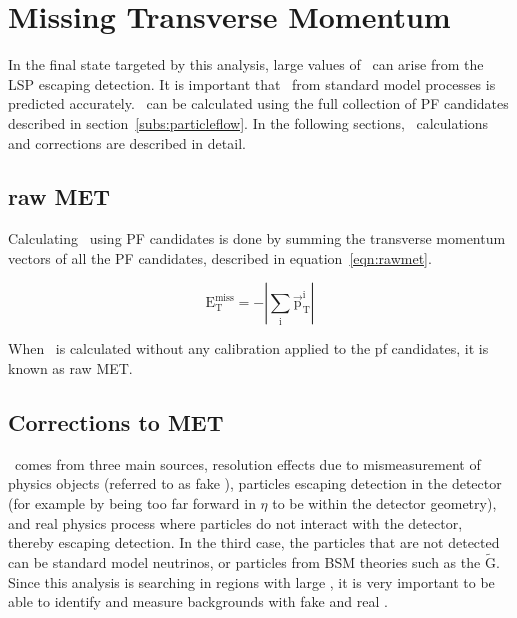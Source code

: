 \chapter{Missing Transverse Momentum}
\label{ch:MET}
In the final state targeted by this analysis, large values of \MET\ can arise from the LSP escaping detection.
It is important that \MET\ from standard model processes is predicted accurately.
\MET\ can be calculated using the full collection of PF candidates described in section~\ref{subs:particleflow}.
In the following sections, \MET\ calculations and corrections are described in detail.

\section{raw MET}

Calculating \MET\ using PF candidates is done by summing the transverse momentum vectors of all the PF candidates, described in equation~\ref{eqn:rawmet}.

\begin{equation}
  \label{eqn:rawmet}
\mathrm{E_{T}^{miss} = -|\sum_{i}\overrightarrow{p}_{T}^{i}|}
\end{equation}

When \MET\ is calculated without any calibration applied to the pf candidates, it is known as raw MET.

\section{Corrections to MET}
\MET\ comes from three main sources, resolution effects due to mismeasurement of physics objects (referred to as fake \MET),
particles escaping detection in the detector (for example by being too far forward in $\eta$ to be within the detector geometry),
and real physics process where particles do not interact with the detector, thereby escaping detection.
In the third case, the particles that are not detected can be standard model neutrinos, or particles from BSM theories such as the $\mathrm{\tilde{G}}$.
Since this analysis is searching in regions with large \MET, it is very important to be able to identify and measure backgrounds with fake \MET and real \MET.

